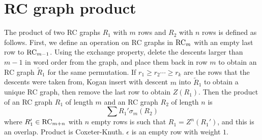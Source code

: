 \documentclass{elsarticle}
\newtheorem{theorem}{Theorem}[section]
\theoremstyle{definition}
\theoremstyle{remark}
\numberwithin{equation}{subsection}
\newcommand{\code}{\mathfrak{c}}
\begin{document}





\section{RC graph product}

The product of two RC graphs $R_1$ with $m$ rows and $R_2$ with $n$ rows is defined as follows. First, we define an operation on RC graphs in $\mathrm{RC}_m$ with an empty last row to $\mathrm{RC}_{m-1}$. Using the exchange property, delete the descents larger than $m-1$ in word order from the graph, and place them back in row $m$ to obtain an RC graph $\widetilde{R}_1$ for the same permutation. If $r_1\geq r_2\cdots \geq r_k$ are the rows that the descents were taken from, Kogan insert with descent $m$ into $\widetilde{R}_1$ to obtain a unique RC graph, then remove the last row to obtain $Z(R_1)$. Then the product of an RC graph $R_1$ of length $m$ and an RC graph $R_2$ of length $n$ is
$$\sum  R_1'\sigma_m(R_2)$$
where $R_1'\in \mathrm{RC}_{m+n}$ with $n$ empty rows is such that $R_1 = Z^n(R_1')$, and this is an overlap. Product is Coxeter-Knuth. $\epsilon$ is an empty row with weight $1$.
\end{document}
